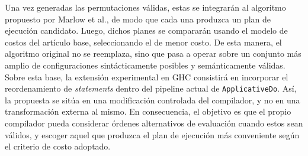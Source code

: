 Una vez generadas las permutaciones válidas, estas se integrarán al algoritmo propuesto por Marlow et al., de modo que cada una produzca un plan de ejecución candidato. Luego, dichos planes se compararán usando el modelo de costos del artículo base, seleccionando el de menor costo. De esta manera, el algoritmo original no se reemplaza, sino que pasa a operar sobre un conjunto más amplio de configuraciones sintácticamente posibles y semánticamente válidas. Sobre esta base, la extensión experimental en \textsf{GHC} consistirá en incorporar el reordenamiento de \textit{statements} dentro del pipeline actual de \texttt{ApplicativeDo}. Así, la propuesta se sitúa en una modificación controlada del compilador, y no en una transformación externa al mismo. En consecuencia, el objetivo es que el propio compilador pueda considerar órdenes alternativos de evaluación cuando estos sean válidos, y escoger aquel que produzca el plan de ejecución más conveniente según el criterio de costo adoptado.

\newpage



